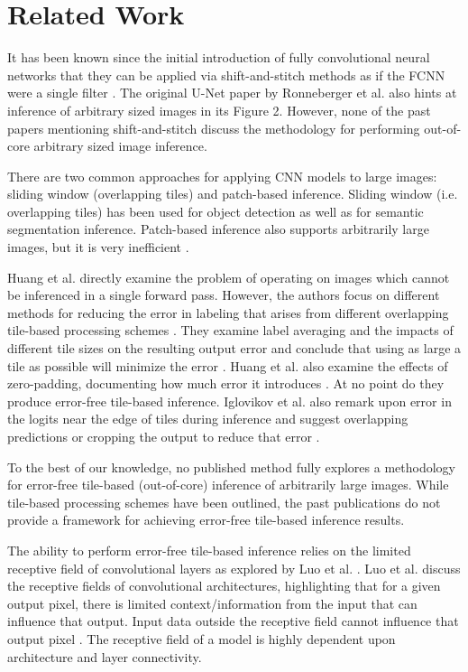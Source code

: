 \documentclass[runningheads]{llncs}
\begin{document}
\section{Related Work}
\label{related-work}

It has been known since the initial introduction of fully convolutional neural networks that they can be applied via shift-and-stitch methods as if the FCNN were a single filter \cite{Long2015,Sherrah2016}.
The original U-Net paper by Ronneberger et al. \cite{Ronneberger2015a} also hints at inference of arbitrary sized images in its Figure 2. However, none of the past papers mentioning shift-and-stitch discuss the methodology for performing out-of-core arbitrary sized image inference.

There are two common approaches for applying CNN models to large images: sliding window (overlapping tiles) and patch-based inference. Sliding window (i.e. overlapping tiles) has been used for object detection \cite{Sermanet2013,VanEtten2019} as well as for semantic segmentation \cite{Lin2019,Volpi2017a} inference. Patch-based inference also supports arbitrarily large images, but it is very inefficient \cite{Volpi2017a,Maggiori2016}.

Huang et al. directly examine the problem of operating on images which cannot be inferenced in a single forward pass. However, the authors focus on different methods for reducing the error in labeling that arises from different overlapping tile-based processing schemes \cite{Huang2019a}. They examine label averaging and the impacts of different tile sizes on the resulting output error and conclude that using as large a tile as possible will minimize the error \cite{Huang2019a}. Huang et al. also examine the effects of zero-padding, documenting how much error it introduces \cite{Huang2019a}. At no point do they produce error-free tile-based inference. Iglovikov et al. also remark upon error in the logits near the edge of tiles during inference and suggest overlapping predictions or cropping the output to reduce that error \cite{Iglovikov2017}. 

To the best of our knowledge, no published method fully explores a methodology for error-free tile-based (out-of-core) inference of arbitrarily large images. While tile-based processing schemes have been outlined, the past publications do not provide a framework for achieving error-free tile-based inference results.

The ability to perform error-free tile-based inference relies on the limited receptive field of convolutional layers as explored by Luo et al. \cite{Luo2016}. Luo et al. discuss the receptive fields of convolutional architectures, highlighting that for a given output pixel, there is limited context/information from the input that can influence that output. Input data outside the receptive field cannot influence that output pixel \cite{Luo2016}. The receptive field of a model is highly dependent upon architecture and layer connectivity. 
\end{document}
